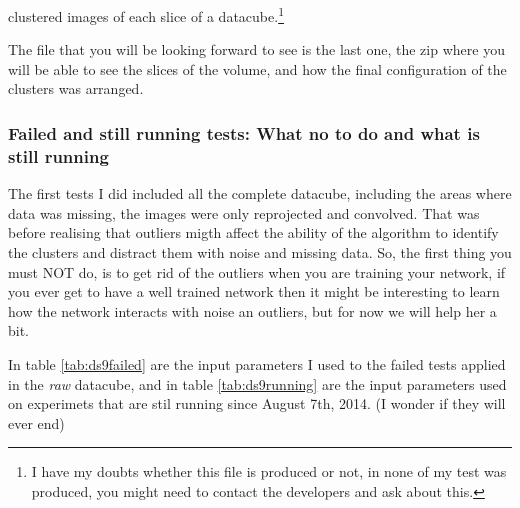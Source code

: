 \documentclass[11pt,fleqn]{book} %
\begin{document}
\begin{itemize}
																																																																																																																																																																																																																														clustered images of each slice of a datacube.\footnote{I have my doubts whether this file is produced or not, in none of my test was produced, you might need to contact the developers and ask about this.}
																																																																																																																																																																																																																														    \end{itemize}
																																																																																																																																																																																																																														    The file that you will be looking forward to see is the last one, the zip where you will be able to see the slices of the volume, and how the final configuration of the clusters was arranged.

																																																																																																																																																																																																																														    \subsubsection{Failed and still running tests: What no to do and what is still running}
																																																																																																																																																																																																																														    The first tests I did included all the complete datacube, including the areas where data was missing, the images were only reprojected and convolved. That was before realising that outliers migth affect the ability of the algorithm to identify the clusters and distract them with noise and missing data. So, the first thing you must NOT do, is to get rid of the outliers when you are training your network, if you ever get to have a well trained network then it might be interesting to learn how the network interacts with noise an outliers, but for now we will help her a bit. 

																																																																																																																																																																																																																														    In table \ref{tab:ds9failed} are the input parameters I used to the failed tests applied in the \emph{raw} datacube, and in table \ref{tab:ds9running} are the input parameters used on experimets that are stil running since August 7th, 2014. (I wonder if they will ever end)
\end{document}
